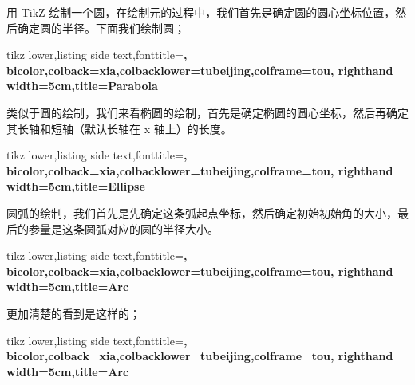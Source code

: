 \documentclass[cn,11pt, simple]{elegantbook}
\begin{document}

用 TikZ 绘制一个圆，在绘制元的过程中，我们首先是确定圆的圆心坐标位置，然后确定圆的半径。下面我们绘制圆；

\begin{tcblisting}{tikz lower,listing side text,fonttitle=\bfseries,
	bicolor,colback=xia,colbacklower=tubeijing,colframe=tou,
	righthand width=5cm,title=Parabola}
\end{tcblisting}

类似于圆的绘制，我们来看椭圆的绘制，首先是确定椭圆的圆心坐标，然后再确定其长轴和短轴（默认长轴在 x 轴上）的长度。

\begin{tcblisting}{tikz lower,listing side text,fonttitle=\bfseries,
	bicolor,colback=xia,colbacklower=tubeijing,colframe=tou,
	righthand width=5cm,title=Ellipse}
\end{tcblisting}

圆弧的绘制，我们首先是先确定这条弧起点坐标，然后确定初始初始角的大小，最后的参量是这条圆弧对应的圆的半径大小。

\begin{tcblisting}{tikz lower,listing side text,fonttitle=\bfseries,
	bicolor,colback=xia,colbacklower=tubeijing,colframe=tou,
	righthand width=5cm,title=Arc}
\end{tcblisting}

更加清楚的看到是这样的；

\begin{tcblisting}{tikz lower,listing side text,fonttitle=\bfseries,
	bicolor,colback=xia,colbacklower=tubeijing,colframe=tou,
	righthand width=5cm,title=Arc}
\end{tcblisting}

\end{document}

